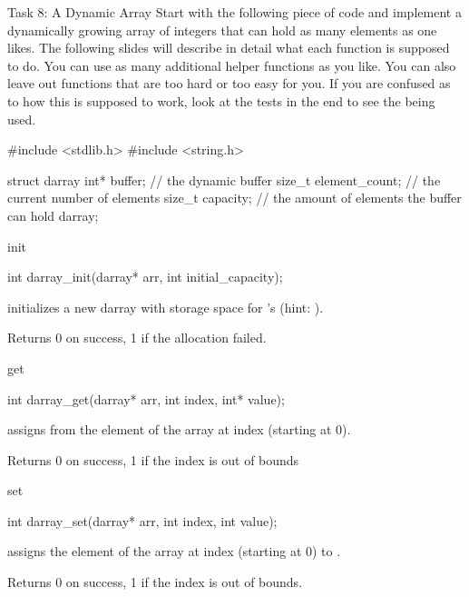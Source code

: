 \documentclass[10pt,graphics,aspectratio=169,table]{beamer}
\begin{document}
\begin{frame}[fragile]{Task 8: A Dynamic Array}
    Start with the following piece of code and implement a dynamically growing
    array of integers that can hold as many elements as one likes.
    The following slides will describe in detail what each function is
    supposed to do. You can use as many additional helper functions as you like.
    You can also leave out functions that are too hard or too easy for you.
    If you are confused as to how this is supposed to work, look at the tests
    in the end to see the  being used.
    \begin{codeblock}
#include <stdlib.h>
#include <string.h>

struct darray{
    int* buffer; // the dynamic buffer
    size_t element_count; // the current number of elements 
    size_t capacity; // the amount of elements the buffer can hold
}darray;

    \end{codeblock}
\end{frame}


\begin{frame}[fragile]{init}
    \begin{codeblock}
int darray_init(darray* arr, int initial_capacity);
    \end{codeblock}

     initializes a new darray 
    with storage space for  's 
    (hint: ).

    Returns 0 on success, 1 if the allocation failed.
\end{frame}

\begin{frame}[fragile]{get}
    \begin{codeblock}
int darray_get(darray* arr, int index, int* value);
    \end{codeblock}

     assigns  from the element of the array
    at index  (starting at 0).

    Returns 0 on success, 1 if the index is out of bounds
\end{frame}

\begin{frame}[fragile]{set}
    \begin{codeblock}
int darray_set(darray* arr, int index, int value);
    \end{codeblock}

     assigns the element of the array at index
     (starting at 0) to .

    Returns 0 on success, 1 if the index is out of bounds.
\end{frame}
\end{document}
